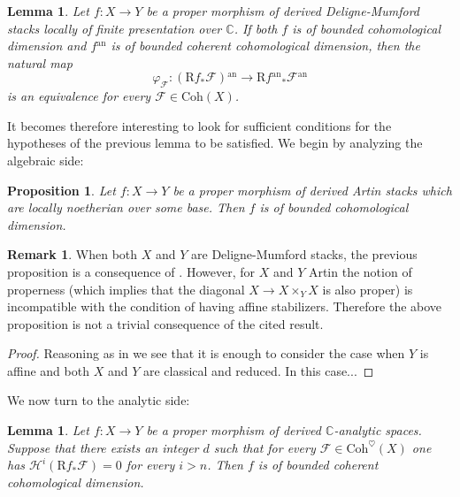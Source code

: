 \documentclass[12pt,a4paper,reqno]{amsart}
\theoremstyle{plain}
\newtheorem{lem}[thm]{Lemma}
\newtheorem{prop}[thm]{Proposition}
\theoremstyle{definition}
\newtheorem{rem}[thm]{Remark}
\theoremstyle{remark}
\numberwithin{equation}{section}
\begin{document}
\begin{lem} \label{lem:GAGA_1_unbounded}
	Let $f \colon X \to Y$ be a proper morphism of derived {Deligne-Mumford\xspace} stacks locally of finite presentation over $\mathbb C$.
	If both $f$ is of bounded cohomological dimension and $f{^\mathrm{an}}$ is of bounded coherent cohomological dimension, then the natural map
	\[ \varphi_{\mathcal F} \colon ({\mathrm R} f_* {\mathcal F}){^\mathrm{an}} \to {\mathrm R} f{^\mathrm{an}}_* {\mathcal F}{^\mathrm{an}} \]
	is an equivalence for every ${\mathcal F} \in {\mathrm{Coh}}(X)$.
\end{lem}

It becomes therefore interesting to look for sufficient conditions for the hypotheses of the previous lemma to be satisfied.
We begin by analyzing the algebraic side:

\begin{prop}
	Let $f \colon X \to Y$ be a proper morphism of derived Artin stacks which are locally noetherian over some base.
	Then $f$ is of bounded cohomological dimension.
\end{prop}

\begin{rem}
	When both $X$ and $Y$ are {Deligne-Mumford\xspace} stacks, the previous proposition is a consequence of \cite[Theorem 1.4.2]{Drinfeld_Gaitsgory_Finiteness_questions_2011}. However, for $X$ and $Y$ Artin the notion of properness (which implies that the diagonal $X \to X \times_Y X$ is also proper) is incompatible with the condition of having affine stabilizers. Therefore the above proposition is not a trivial consequence of the cited result.
\end{rem}

\begin{proof}
	Reasoning as in \cite{Drinfeld_Gaitsgory_Finiteness_questions_2011} we see that it is enough to consider the case when $Y$ is affine and both $X$ and $Y$ are classical and reduced.
	In this case...
\end{proof}

We now turn to the analytic side:

\begin{lem}
	Let $f \colon X \to Y$ be a proper morphism of derived {$\mathbb C$-analytic\xspace} spaces.
	Suppose that there exists an integer $d$ such that for every ${\mathcal F} \in {\mathrm{Coh}}^\heartsuit(X)$ one has ${\mathcal H}^i({\mathrm R} f_* {\mathcal F}) = 0$ for every $i > n$.
	Then $f$ is of bounded coherent cohomological dimension.
\end{lem}
\end{document}
